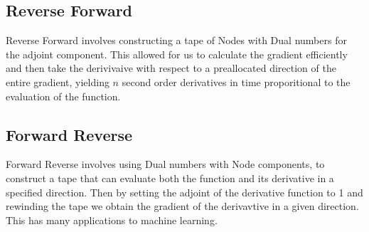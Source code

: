 \documentclass[a0,landscape]{a0poster}
\begin{document}
\begin{multicols}{4}
\subsection*{Reverse Forward}
Reverse Forward involves constructing a tape of Nodes with Dual numbers for the
adjoint component. This allowed for us to calculate the gradient efficiently and
then take the derivivaive with respect to a preallocated direction of the entire
gradient, yielding $n$ second order derivatives in time proporitional to the 
evaluation of the function. 

\subsection*{Forward Reverse}
Forward Reverse involves using Dual numbers with Node components, to construct a 
tape that can evaluate both the function and its derivative in a specified direction.
Then by setting the adjoint of the derivative function to 1 and rewinding the tape
we obtain the gradient of the derivavtive in a given direction. This has many applications
to machine learning.
\end{multicols}
\end{document}
